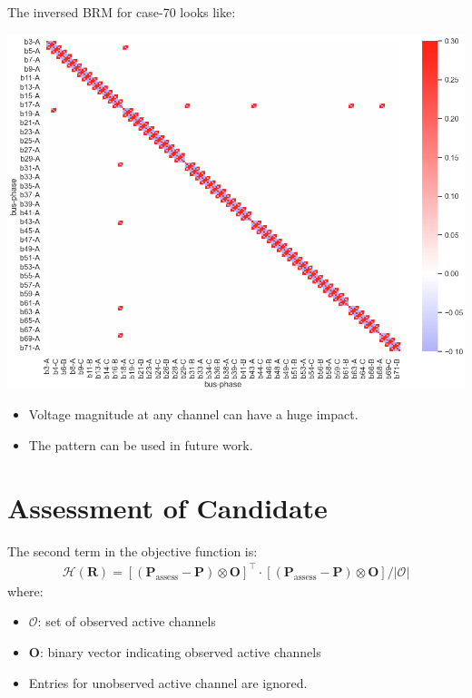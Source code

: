 \documentclass[
]{book}
\providecommand{\tightlist}{%
  \setlength{\itemsep}{0pt}\setlength{\parskip}{0pt}}
\begin{document}
The inversed BRM for case-70 looks like:

\begin{center}\includegraphics{Pictures/figHeatmapBrmInv} \end{center}

\begin{itemize}
\tightlist
\item
  Voltage magnitude at any channel can have a huge impact.
\item
  The pattern can be used in future work.
\end{itemize}

\hypertarget{assessment}{%
\section{Assessment of Candidate}\label{assessment}}

The second term in the objective function is:
\[ \begin{aligned}
  \mathcal{H}(\boldsymbol{R}) =
  \left[
    (\boldsymbol{P}_\text{assess} - \boldsymbol{P})
    \otimes \boldsymbol{O}
  \right]^\top
  \cdot \left[
    (\boldsymbol{P}_\text{assess} - \boldsymbol{P})
    \otimes \boldsymbol{O}
  \right]
  / |\mathcal{O}|
\end{aligned} \]
where:

\begin{itemize}
\tightlist
\item
  \(\mathcal{O}\): set of observed active channels
\item
  \(\boldsymbol{O}\): binary vector indicating observed active channels
\item
  Entries for unobserved active channel are ignored.
\end{itemize}
\end{document}
